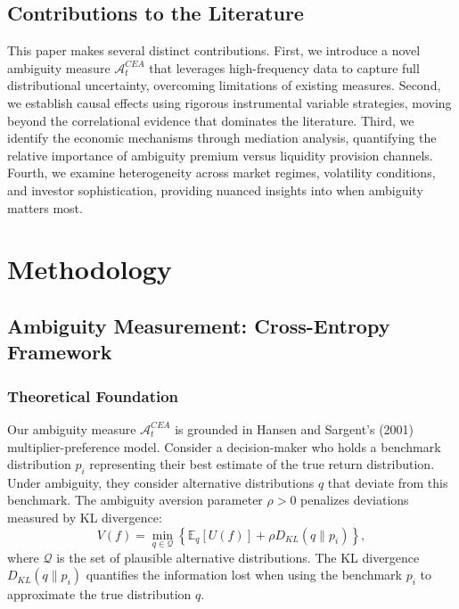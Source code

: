 \documentclass[preprint,12pt,authoryear]{elsarticle}
\begin{document}
\subsection{Contributions to the Literature}

This paper makes several distinct contributions. First, we introduce a novel ambiguity measure $\mathcal{A}^{CEA}_t$ that leverages high-frequency data to capture full distributional uncertainty, overcoming limitations of existing measures. Second, we establish causal effects using rigorous instrumental variable strategies, moving beyond the correlational evidence that dominates the literature. Third, we identify the economic mechanisms through mediation analysis, quantifying the relative importance of ambiguity premium versus liquidity provision channels. Fourth, we examine heterogeneity across market regimes, volatility conditions, and investor sophistication, providing nuanced insights into when ambiguity matters most.

\section{Methodology}

\subsection{Ambiguity Measurement: Cross-Entropy Framework}

\subsubsection{Theoretical Foundation}
Our ambiguity measure $\mathcal{A}^{CEA}_t$ is grounded in Hansen and Sargent's (2001) multiplier-preference model. Consider a decision-maker who holds a benchmark distribution $p_i$ representing their best estimate of the true return distribution. Under ambiguity, they consider alternative distributions $q$ that deviate from this benchmark. The ambiguity aversion parameter $\rho > 0$ penalizes deviations measured by KL divergence:
\begin{equation}
V(f) = \min_{q \in \mathcal{Q}} \left\{ \mathbb{E}_q[U(f)] + \rho D_{KL}(q \| p_i) \right\},
\end{equation}
where $\mathcal{Q}$ is the set of plausible alternative distributions. The KL divergence $D_{KL}(q \| p_i)$ quantifies the information lost when using the benchmark $p_i$ to approximate the true distribution $q$.
\end{document}
